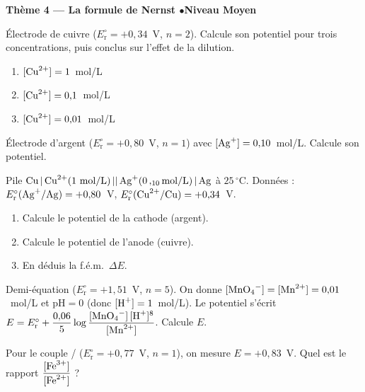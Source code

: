 \documentclass[11pt,a4paper]{article}
\begin{document}
\begin{center}\color{primarydark}\large\bfseries Thème 4 — La formule de Nernst \quad$\bullet$\quad Niveau Moyen\end{center}

\begin{exo}
Électrode de cuivre  ($E_{\mathrm{r}}^{\circ}=+0{,}34$~V, $n=2$). Calcule
son potentiel pour trois concentrations, puis conclus sur l'effet de la dilution.
\begin{enumerate}[label=\alph*)]
  \item $[\ce{Cu^{2+}}]=1$~mol/L
  \item $[\ce{Cu^{2+}}]=0{,}1$~mol/L
  \item $[\ce{Cu^{2+}}]=0{,}01$~mol/L
\end{enumerate}
\end{exo}

\begin{exo}
Électrode d'argent  ($E_{\mathrm{r}}^{\circ}=+0{,}80$~V, $n=1$) avec
$[\ce{Ag+}]=0{,}10$~mol/L. Calcule son potentiel.
\end{exo}

\begin{exo}
Pile $\ce{Cu | Cu^{2+}(1\,mol/L) || Ag+(0{,}10\,mol/L) | Ag}$ à $25\,^{\circ}$C. Données :
$E_{\mathrm{r}}^{\circ}(\ce{Ag+}/\ce{Ag})=+0{,}80$~V, $E_{\mathrm{r}}^{\circ}(\ce{Cu^{2+}}/\ce{Cu})
=+0{,}34$~V.
\begin{enumerate}[label=\alph*)]
  \item Calcule le potentiel de la cathode (argent).
  \item Calcule le potentiel de l'anode (cuivre).
  \item En déduis la f.é.m.\ $\Delta E$.
\end{enumerate}
\end{exo}

\begin{exo}
Demi-équation  ($E_{\mathrm{r}}^{\circ}=+1{,}51$~V,
$n=5$). On donne $[\ce{MnO4^-}]=[\ce{Mn^{2+}}]=0{,}01$~mol/L et $\mathrm{pH}=0$ (donc $[\ce{H+}]=1$~mol/L).
Le potentiel s'écrit $E=E_{\mathrm{r}}^{\circ}+\dfrac{0{,}06}{5}\log\dfrac{[\ce{MnO4^-}]\,[\ce{H+}]^{8}}
{[\ce{Mn^{2+}}]}$. Calcule $E$.
\end{exo}

\begin{exo}
Pour le couple / ($E_{\mathrm{r}}^{\circ}=+0{,}77$~V, $n=1$), on mesure
$E=+0{,}83$~V. Quel est le rapport $\dfrac{[\ce{Fe^{3+}}]}{[\ce{Fe^{2+}}]}$ ?
\end{exo}
\end{document}
